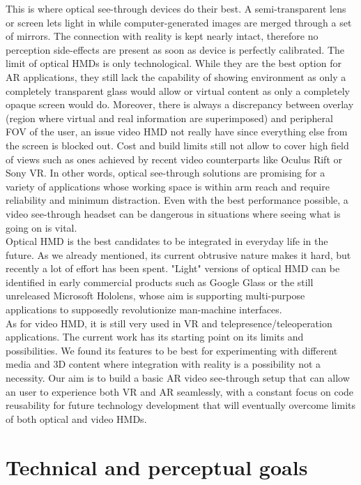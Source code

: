 This is where optical see-through devices do their best. A semi-transparent lens or screen lets light in while computer-generated images are merged through a set of mirrors. The connection with reality is kept nearly intact, therefore no perception side-effects are present as soon as device is perfectly calibrated. The limit of optical HMDs is only technological. While they are the best option for AR applications, they still lack the capability of showing environment as only a completely transparent glass would allow or virtual content as only a completely opaque screen would do. Moreover, there is always a discrepancy between overlay (region where virtual and real information are superimposed) and peripheral FOV of the user, an issue video HMD not really have since everything else from the screen is blocked out. Cost and build limits still not allow to cover high field of views such as ones achieved by recent video counterparts like Oculus Rift or Sony VR. In other words, optical see-through solutions are promising for a variety of applications whose working space is within arm reach and require reliability and minimum distraction. Even with the best performance possible, a video see-through headset can be dangerous in situations where seeing what is going on is vital.\\
Optical HMD is the best candidates to be integrated in everyday life in the future. As we already mentioned, its current obtrusive nature makes it hard, but recently a lot of effort has been spent. "Light" versions of optical HMD can be identified in early commercial products such as Google Glass or the still unreleased Microsoft Hololens, whose aim is supporting multi-purpose applications to supposedly revolutionize man-machine interfaces.\\
As for video HMD, it is still very used in VR and telepresence/teleoperation applications. The current work has its starting point on its limits and possibilities. We found its features to be best for experimenting with different media and 3D content where integration with reality is a possibility not a necessity. Our aim is to build a basic AR video see-through setup that can allow an user to experience both VR and AR seamlessly, with a constant focus on code reusability for future technology development that will eventually overcome limits of both optical and video HMDs.

\section{Technical and perceptual goals}
